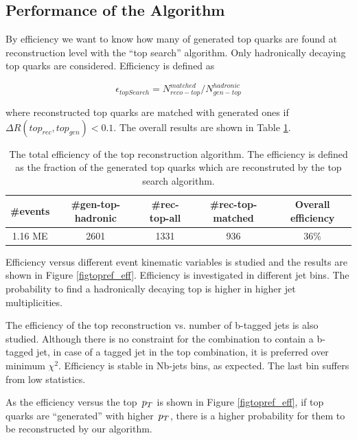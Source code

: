 \subsection{Performance of the Algorithm}
By efficiency we want to know how many of generated top quarks are found at reconstruction level with the “top search” algorithm. Only hadronically decaying top quarks are considered. Efficiency is defined as 

$$\epsilon_{topSearch} = N_{reco-top}^{matched}  / N_{gen-top}^{hadronic}$$

where reconstructed top quarks are matched with generated ones if $\Delta R(top_{rec},top_{gen}) < 0.1$. The overall results are shown in Table \ref{tbltopreceff}.

\begin{table}[htb]
  \begin{center}
    \begin{tabular}{|c|c|c|c|c|}
      \hline
      \textbf{\#events}  &  \textbf{\#gen-top-hadronic}  &  \textbf{\#rec-top-all}  &  \textbf{\#rec-top-matched}  &  \textbf{Overall efficiency}  \\
      \hline
      1.16 ME          &                        2601  &                   1331  &                   936  &  36\%                  \\
      \hline
    \end{tabular}
    \caption{The total efficiency of the top reconstruction algorithm. The efficiency is defined as the fraction of the generated top quarks which are reconstruted by the top search algorithm.}
    \label{tbltopreceff}
  \end{center}
\end{table}

Efficiency versus different event kinematic variables is studied and the results are shown in Figure \ref{figtopref_eff}. Efficiency is investigated in different jet bins. The probability to find a hadronically decaying top is higher in higher jet multiplicities.

The efficiency of the top reconstruction vs. number of b-tagged jets is also studied. Although there is no constraint for the combination to contain a b-tagged jet, in case of a tagged jet in the top combination, it is preferred over minimum $\chi^2$. Efficiency is stable in Nb-jets bins, as expected. The last bin suffers from low statistics.

As the efficiency versus the top $\,p_T$ is shown in Figure \ref{figtopref_eff}, if top quarks are “generated” with higher $\,p_T$, there is a higher probability for them to be reconstructed by our algorithm.

